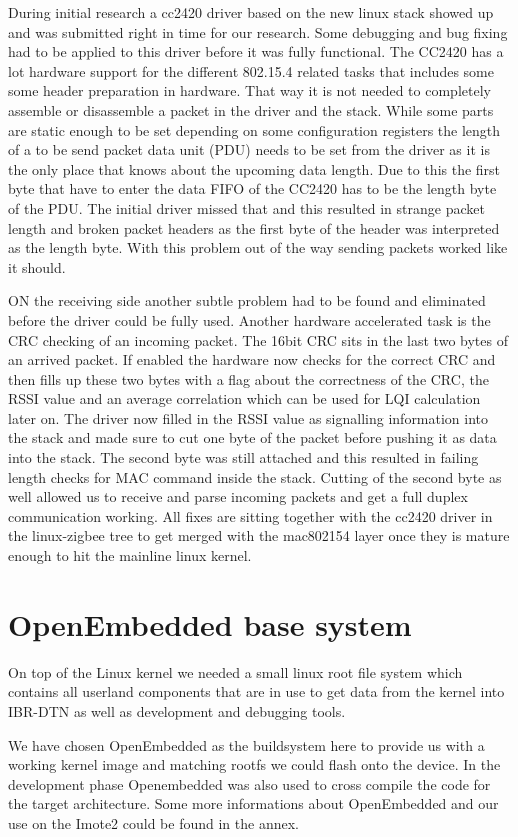 During initial research a cc2420 driver based on the new linux stack showed up
and was submitted right in time for our research. Some debugging and bug fixing
had to be applied to this driver before it was fully functional. The CC2420 has
a lot hardware support for the different 802.15.4 related tasks that includes
some some header preparation in hardware. That way it is not needed to
completely assemble or disassemble a packet in the driver and the stack. While
some parts are static enough to be set depending on some configuration registers
the length of a to be send packet data unit (PDU) needs to be set from the driver
as it is the only place that knows about the upcoming data length. Due to this
the first byte that have to enter the data FIFO of the CC2420 has to be the
length byte of the PDU. The initial driver missed that and this resulted in
strange packet length and broken packet headers as the first byte of the header
was interpreted as the length byte. With this problem out of the way sending
packets worked like it should.

ON the receiving side another subtle problem had to be found and eliminated
before the driver could be fully used. Another hardware accelerated task is the
CRC checking of an incoming packet. The 16bit CRC sits in the last two bytes of
an arrived packet. If enabled the hardware now checks for the correct CRC and
then fills up these two bytes with a flag about the correctness of the CRC, the
RSSI value and an average correlation which can be used for LQI calculation
later on. The driver now filled in the RSSI value as signalling information into
the stack and made sure to cut one byte of the packet before pushing it as data
into the stack. The second byte was still attached and this resulted in failing
length checks for MAC command inside the stack. Cutting of the second byte as
well allowed us to receive and parse incoming packets and get a full duplex
communication working. All fixes are sitting together with the cc2420 driver
in the linux-zigbee tree to get merged with the mac802154 layer once they is
mature enough to hit the mainline linux kernel.

\section{OpenEmbedded base system}
On top of the Linux kernel we needed a small linux root file system which
contains all userland components that are in use to get data from the kernel
into IBR-DTN as well as development and debugging tools.

We have chosen OpenEmbedded as the buildsystem here to provide us with a working
kernel image and matching rootfs we could flash onto the device. In the
development phase Openembedded was also used to cross compile the code for the
target architecture. Some more informations about OpenEmbedded and our use on the
Imote2 could be found in the annex.
